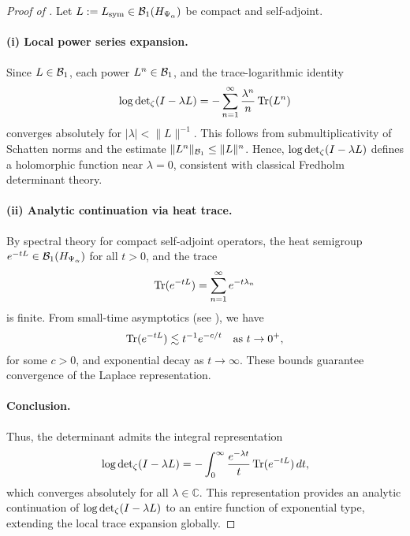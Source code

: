\begin{proof}[Proof of ]
Let \( L := L_{\mathrm{sym}} \in \mathcal{B}_1(H_{\Psi_\alpha}) \) be compact and self-adjoint.

\paragraph{(i) Local power series expansion.}
Since \( L \in \mathcal{B}_1 \), each power \( L^n \in \mathcal{B}_1 \), and the trace-logarithmic identity
\[
\log \det\nolimits_{\zeta}(I - \lambda L)
= - \sum_{n=1}^\infty \frac{\lambda^n}{n} \operatorname{Tr}(L^n)
\]
converges absolutely for \( |\lambda| < \|L\|^{-1} \). This follows from submultiplicativity of Schatten norms and the estimate \( \|L^n\|_{\mathcal{B}_1} \le \|L\|^n \). Hence, \( \log \det\nolimits_{\zeta}(I - \lambda L) \) defines a holomorphic function near \( \lambda = 0 \), consistent with classical Fredholm determinant theory.

\paragraph{(ii) Analytic continuation via heat trace.}
By spectral theory for compact self-adjoint operators, the heat semigroup \( e^{-tL} \in \mathcal{B}_1(H_{\Psi_\alpha}) \) for all \( t > 0 \), and the trace
\[
\operatorname{Tr}(e^{-tL}) = \sum_{n=1}^\infty e^{-t\lambda_n}
\]
is finite. From small-time asymptotics (see ), we have
\[
\operatorname{Tr}(e^{-tL}) \lesssim t^{-1} e^{-c/t} \quad \text{as } t \to 0^+,
\]
for some \( c > 0 \), and exponential decay as \( t \to \infty \). These bounds guarantee convergence of the Laplace representation.

\paragraph{Conclusion.}
Thus, the determinant admits the integral representation
\[
\log \det\nolimits_{\zeta}(I - \lambda L)
= - \int_0^\infty \frac{e^{-\lambda t}}{t} \operatorname{Tr}(e^{-tL}) \, dt,
\]
which converges absolutely for all \( \lambda \in \mathbb{C} \). This representation provides an analytic continuation of \( \log \det\nolimits_{\zeta}(I - \lambda L) \) to an entire function of exponential type, extending the local trace expansion globally.
\end{proof}

